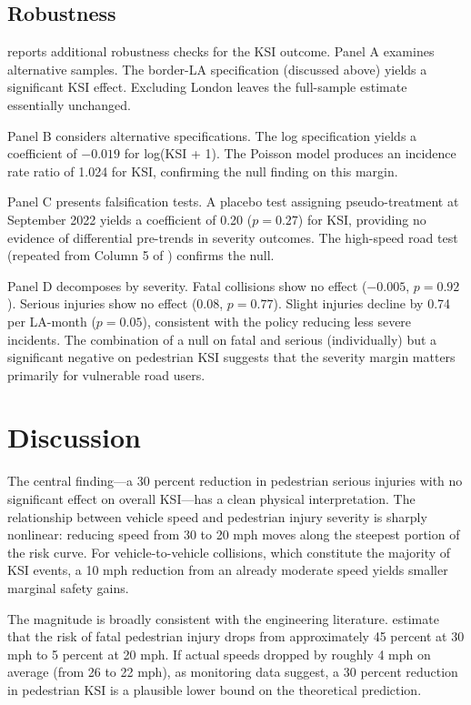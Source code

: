 \documentclass[12pt]{article}
\begin{document}
\subsection{Robustness}

 reports additional robustness checks for the KSI outcome. Panel A examines alternative samples. The border-LA specification (discussed above) yields a significant KSI effect. Excluding London leaves the full-sample estimate essentially unchanged.

Panel B considers alternative specifications. The log specification yields a coefficient of $-0.019$ for log(KSI + 1). The Poisson model produces an incidence rate ratio of 1.024 for KSI, confirming the null finding on this margin.

Panel C presents falsification tests. A placebo test assigning pseudo-treatment at September 2022 yields a coefficient of 0.20 ($p = 0.27$) for KSI, providing no evidence of differential pre-trends in severity outcomes. The high-speed road test (repeated from Column 5 of ) confirms the null.

Panel D decomposes by severity. Fatal collisions show no effect ($-0.005$, $p = 0.92$). Serious injuries show no effect ($0.08$, $p = 0.77$). Slight injuries decline by 0.74 per LA-month ($p = 0.05$), consistent with the policy reducing less severe incidents. The combination of a null on fatal and serious (individually) but a significant negative on pedestrian KSI suggests that the severity margin matters primarily for vulnerable road users.


\section{Discussion}

The central finding---a 30 percent reduction in pedestrian serious injuries with no significant effect on overall KSI---has a clean physical interpretation. The relationship between vehicle speed and pedestrian injury severity is sharply nonlinear: reducing speed from 30 to 20 mph moves along the steepest portion of the risk curve. For vehicle-to-vehicle collisions, which constitute the majority of KSI events, a 10 mph reduction from an already moderate speed yields smaller marginal safety gains.

The magnitude is broadly consistent with the engineering literature. \citet{Rosén2011} estimate that the risk of fatal pedestrian injury drops from approximately 45 percent at 30 mph to 5 percent at 20 mph. If actual speeds dropped by roughly 4 mph on average (from 26 to 22 mph), as monitoring data suggest, a 30 percent reduction in pedestrian KSI is a plausible lower bound on the theoretical prediction.
\end{document}
